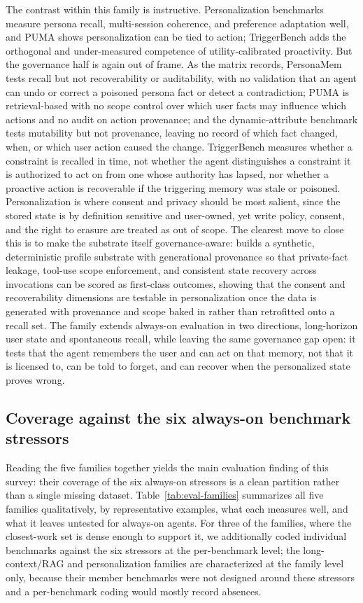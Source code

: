 The contrast within this family is instructive. Personalization benchmarks measure persona recall, multi-session coherence, and preference adaptation well, and PUMA shows personalization can be tied to action; TriggerBench adds the orthogonal and under-measured competence of utility-calibrated proactivity. But the governance half is again out of frame. As the matrix records, PersonaMem tests recall but not recoverability or auditability, with no validation that an agent can undo or correct a poisoned persona fact or detect a contradiction; PUMA is retrieval-based with no scope control over which user facts may influence which actions and no audit on action provenance; and the dynamic-attribute benchmark tests mutability but not provenance, leaving no record of which fact changed, when, or which user action caused the change. TriggerBench measures whether a constraint is recalled in time, not whether the agent distinguishes a constraint it is authorized to act on from one whose authority has lapsed, nor whether a proactive action is recoverable if the triggering memory was stale or poisoned. Personalization is where consent and privacy should be most salient, since the stored state is by definition sensitive and user-owned, yet write policy, consent, and the right to erasure are treated as out of scope. The clearest move to close this is to make the substrate itself governance-aware: \citet{selvam2026profilefoundry} builds a synthetic, deterministic profile substrate with generational provenance so that private-fact leakage, tool-use scope enforcement, and consistent state recovery across invocations can be scored as first-class outcomes, showing that the consent and recoverability dimensions are testable in personalization once the data is generated with provenance and scope baked in rather than retrofitted onto a recall set. The family extends always-on evaluation in two directions, long-horizon user state and spontaneous recall, while leaving the same governance gap open: it tests that the agent remembers the user and can act on that memory, not that it is licensed to, can be told to forget, and can recover when the personalized state proves wrong.

\subsection{Coverage against the six always-on benchmark stressors}

Reading the five families together yields the main evaluation finding of this survey: their coverage of the six always-on stressors is a clean partition rather than a single missing dataset. Table~\ref{tab:eval-families} summarizes all five families qualitatively, by representative examples, what each measures well, and what it leaves untested for always-on agents. For three of the families, where the closest-work set is dense enough to support it, we additionally coded individual benchmarks against the six stressors at the per-benchmark level; the long-context/RAG and personalization families are characterized at the family level only, because their member benchmarks were not designed around these stressors and a per-benchmark coding would mostly record absences.

